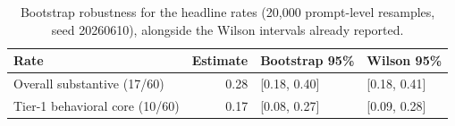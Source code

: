 \begin{table}[htbp]
\centering
\caption{Bootstrap robustness for the headline rates (20{,}000 prompt-level resamples, seed 20260610), alongside the Wilson intervals already reported.}
\label{tab:bootstrap-rates}
\small
\begin{tabular}{lrll}
\toprule
Rate & Estimate & Bootstrap 95\% & Wilson 95\% \\
\midrule
Overall substantive (17/60) & 0.28 & [0.18, 0.40] & [0.18, 0.41] \\
Tier-1 behavioral core (10/60) & 0.17 & [0.08, 0.27] & [0.09, 0.28] \\
\bottomrule
\end{tabular}
\end{table}
